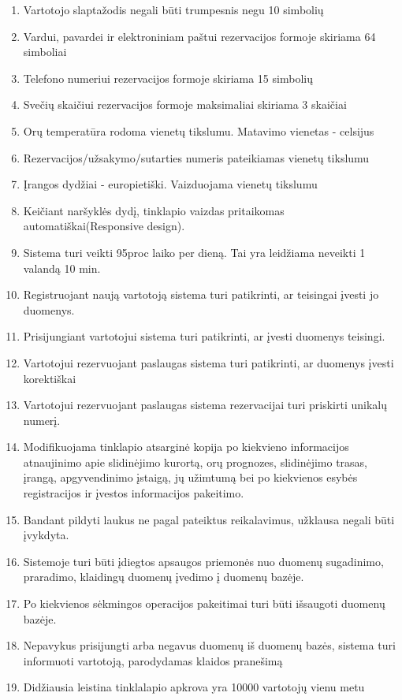 \documentclass[oneside]{VUMIFPSkursinis}
\begin{document}
\begin{enumerate}
	\item Vartotojo slaptažodis negali būti trumpesnis negu 10 simbolių
	\item Vardui, pavardei ir elektroniniam paštui rezervacijos formoje skiriama 64 simboliai
	\item Telefono numeriui rezervacijos formoje skiriama 15 simbolių
	\item Svečių skaičiui rezervacijos formoje maksimaliai skiriama 3 skaičiai
	\item Orų temperatūra rodoma vienetų tikslumu. Matavimo vienetas - celsijus
	\item Rezervacijos/užsakymo/sutarties numeris pateikiamas vienetų tikslumu
	\item Įrangos dydžiai - europietiški. Vaizduojama vienetų tikslumu
	\item Keičiant naršyklės dydį, tinklapio vaizdas pritaikomas automatiškai(Responsive design).
	\item Sistema turi veikti 95proc laiko per dieną. Tai yra leidžiama neveikti 1 valandą 10 min.	
	\item Registruojant naują vartotoją sistema turi patikrinti, ar teisingai įvesti jo duomenys.
	\item Prisijungiant vartotojui sistema turi patikrinti, ar įvesti duomenys teisingi.
	\item Vartotojui rezervuojant paslaugas sistema turi patikrinti, ar duomenys įvesti korektiškai
	\item Vartotojui rezervuojant paslaugas sistema rezervacijai turi priskirti unikalų numerį.
	\item Modifikuojama tinklapio atsarginė kopija po kiekvieno informacijos atnaujinimo apie slidinėjimo kurortą, orų prognozes, slidinėjimo trasas, įrangą, apgyvendinimo įstaigą, jų užimtumą bei po kiekvienos esybės registracijos ir įvestos informacijos pakeitimo.
	\item Bandant pildyti laukus ne pagal pateiktus reikalavimus, užklausa negali būti įvykdyta.
	\item Sistemoje turi būti įdiegtos apsaugos priemonės nuo duomenų sugadinimo, praradimo, klaidingų duomenų įvedimo į duomenų bazėje.
	\item Po kiekvienos sėkmingos operacijos pakeitimai turi būti išsaugoti duomenų bazėje.
	\item Nepavykus prisijungti arba negavus duomenų iš duomenų bazės, sistema turi informuoti vartotoją, parodydamas klaidos pranešimą
	\item Didžiausia leistina tinklalapio apkrova yra 10000 vartotojų vienu metu

\end{enumerate}
\end{document}
